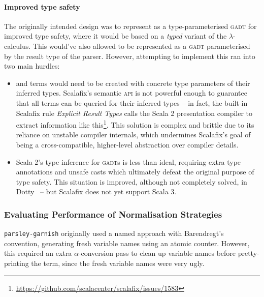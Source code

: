 \documentclass[../../../main.tex]{subfiles}
\begin{document}
\paragraph{Improved type safety}
The originally intended design was to represent  as a type-parameterised \textsc{gadt} for improved type safety, where it would be based on a \emph{typed} variant of the $\lambda$-calculus.
This would've also allowed  to be represented as a \textsc{gadt} parameterised by the result type of the parser.
However, attempting to implement this ran into two main hurdles:
\begin{itemize}
  \item {} and  terms would need to be created with concrete type parameters of their inferred types. Scalafix's semantic \textsc{api} is not powerful enough to guarantee that all terms can be queried for their inferred types -- in fact, the built-in Scalafix rule \emph{Explicit Result Types} calls the Scala 2 presentation compiler to extract information like this\footnote{\url{https://github.com/scalacenter/scalafix/issues/1583}}. This solution is complex and brittle due to its reliance on unstable compiler internals, which undermines Scalafix's goal of being a cross-compatible, higher-level abstraction over compiler details.
  \item Scala 2's type inference for \textsc{gadt}s is less than ideal, requiring extra type annotations and unsafe casts which ultimately defeat the original purpose of type safety. This situation is improved, although not completely solved, in Dotty~\cite{parreaux_towards_2019} -- but Scalafix does not yet support Scala 3.
\end{itemize}

\subsubsection{Evaluating Performance of Normalisation Strategies}
\texttt{parsley-garnish} originally used a named approach with Barendregt's convention, generating fresh variable names using an atomic counter.
However, this required an extra $\alpha$-conversion pass to clean up variable names before pretty-printing the term, since the fresh variable names were very ugly.
\end{document}
